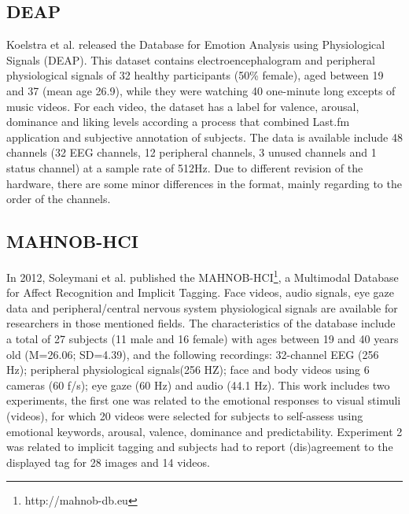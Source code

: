 \documentclass{sig-alternate}
\begin{document}
\subsection{DEAP}
Koelstra et al. \cite{deap2011} released the Database for Emotion Analysis 
using Physiological Signals (DEAP). This dataset contains electroencephalogram 
and peripheral physiological signals of 32 healthy participants (50\% female), 
aged between 19 and 37 (mean age 26.9), while they were watching
40 one-minute long excepts of music videos. For each video, the dataset has 
a label for valence, arousal, dominance and liking levels according a process 
that combined  Last.fm application and subjective annotation of subjects.  The data 
is available include 48 channels (32 EEG channels, 12 peripheral channels, 3 
unused channels and 1 status channel) at a sample rate of 512Hz. Due to
 different revision of the hardware, there are some minor differences in the 
 format, mainly regarding to the order of the  channels.

 \subsection{MAHNOB-HCI}
 In 2012, Soleymani et al. \cite{soleymani2012multimodal} published the MAHNOB-HCI\footnote{http://mahnob-db.eu}, a Multimodal Database for Affect Recognition and Implicit Tagging. Face videos, audio signals, eye gaze data and peripheral/central nervous system physiological signals are available for researchers in those mentioned fields. The characteristics of the database include a total of 27 subjects (11 male and 16 female) with ages between 19 and 40 years old (M=26.06; SD=4.39), and the following recordings: 32-channel EEG (256 Hz); peripheral physiological signals(256 HZ); face and body videos using 6 cameras (60 f/s); eye gaze (60 Hz) and audio (44.1 Hz). This work includes two experiments, the first one was related to the emotional responses to visual stimuli (videos), for which 20 videos were selected for subjects to self-assess using emotional keywords, arousal, valence, dominance and predictability. Experiment 2 was related to implicit tagging and subjects had to report (dis)agreement to the displayed tag for 28 images and 14 videos.
 
\end{document}
